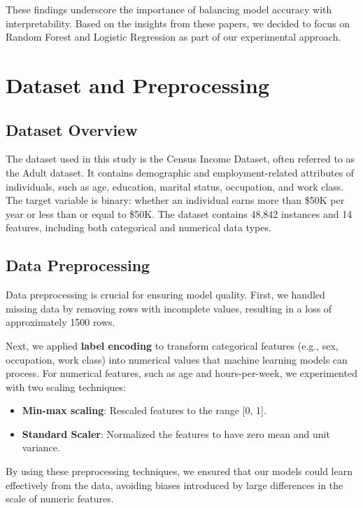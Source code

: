 \documentclass[10pt,twocolumn,letterpaper]{article}
\begin{document}
These findings underscore the importance of balancing model accuracy with interpretability. Based on the insights from these papers, we decided to focus on Random Forest and Logistic Regression as part of our experimental approach.

\section{Dataset and Preprocessing}
\label{sec:dataset}

\subsection{Dataset Overview}
The dataset used in this study is the Census Income Dataset, often referred to as the Adult dataset. It contains demographic and employment-related attributes of individuals, such as age, education, marital status, occupation, and work class. The target variable is binary: whether an individual earns more than \$50K per year or less than or equal to \$50K. The dataset contains 48,842 instances and 14 features, including both categorical and numerical data types.

\subsection{Data Preprocessing}
Data preprocessing is crucial for ensuring model quality. First, we handled missing data by removing rows with incomplete values, resulting in a loss of approximately 1500 rows. 

Next, we applied \textbf{label encoding} to transform categorical features (e.g., sex, occupation, work class) into numerical values that machine learning models can process. For numerical features, such as age and hours-per-week, we experimented with two scaling techniques:
\begin{itemize}
    \item \textbf{Min-max scaling}: Rescaled features to the range [0, 1].
    \item \textbf{Standard Scaler}: Normalized the features to have zero mean and unit variance.
\end{itemize}

By using these preprocessing techniques, we ensured that our models could learn effectively from the data, avoiding biases introduced by large differences in the scale of numeric features.

\end{document}
